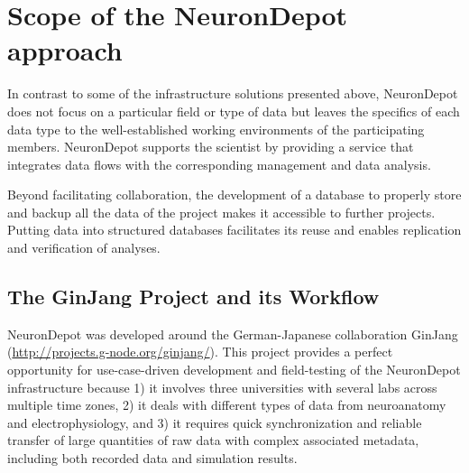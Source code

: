 \documentclass{frontiersSCNS} %
\begin{document}

\section{Scope of the NeuronDepot approach}

In contrast to some of the infrastructure solutions presented above,
NeuronDepot does not focus on a particular field or type of data but leaves the
specifics of each data type to the well-established working environments of the
participating members. NeuronDepot supports the scientist by providing a
service that integrates data flows with the corresponding management and data
analysis.

Beyond facilitating collaboration, the development of a database to properly
store and backup all the data of the project makes it accessible to further
projects. Putting data into structured databases facilitates its reuse and
enables replication and verification of analyses.

\subsection{The GinJang Project and its Workflow}
\label{sec:ginjang}
NeuronDepot was developed around the German-Japanese collaboration GinJang
(\url{http://projects.g-node.org/ginjang/}).
This project provides a perfect opportunity for use-case-driven development and
field-testing of the NeuronDepot infrastructure because 1) it involves three
universities with several labs across multiple time zones, 2) it deals with
different types of data from neuroanatomy and electrophysiology, and 3) it
requires quick synchronization and reliable transfer of large quantities of raw
data with complex associated metadata, including both recorded data and
simulation results.
\end{document}

